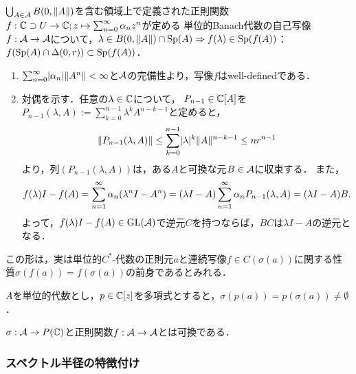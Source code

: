 \documentclass[uplatex,dvipdfmx]{jsreport}
\begin{document}
\begin{lemma}
    $\bigcup_{A\in\mathcal{A}}B(0,\|A\|)$を含む領域上で定義された正則関数$f:\mathbb{C}\supset U\to\mathbb{C};z\mapsto\sum_{n=0}^\infty\alpha_nz^n$が定める
    単位的Banach代数の自己写像$f:\mathcal{A}\to\mathcal{A}$について，$\lambda\in B(0,\|A\|)\cap\mathrm{Sp}(A)\Rightarrow f(\lambda)\in\mathrm{Sp}(f(A))$：$f(\mathrm{Sp}(A)\cap \Delta(0,r))\subset\mathrm{Sp}(f(A))$．
\end{lemma}
\begin{Proof}\mbox{}
    \begin{enumerate}
        \item $\sum_{n=0}^\infty\lvert\alpha_n\rvert\|A^n\|<\infty$と$\mathcal{A}$の完備性より，写像$f$はwell-definedである．
        \item 対偶を示す．任意の$\lambda\in\mathbb{C}$について，
        $P_{n-1}\in\mathbb{C}[A]$を$P_{n-1}(\lambda,A):=\sum_{k=0}^{n-1}\lambda^kA^{n-k-1}$と定めると，
        \[\|P_{n-1}(\lambda,A)\|\le\sum^{n-1}_{k=0}\lvert\lambda\rvert^k\|A\|^{n-k-1}\le nr^{n-1}\]
        より，列$(P_{n-1}(\lambda,A))$は，ある$A$と可換な元$B\in\mathcal{A}$に収束する．
        また，
        \[f(\lambda)I-f(A)=\sum^\infty_{n=1}\alpha_n(\lambda^nI-A^n)=(\lambda I-A)\sum^\infty_{n=1}\alpha_nP_{n-1}(\lambda,A)=(\lambda I-A)B.\]
        よって，$f(\lambda)I-f(A)\in\mathrm{GL}(\mathcal{A})$で逆元$C$を持つならば，$BC$は$\lambda I-A$の逆元となる．
    \end{enumerate}
\end{Proof}
\begin{remarks}
    この形は，実は単位的$C^*$-代数の正則元$a$と連続写像$f\in C(\sigma(a))$に関する性質$\sigma(f(a))=f(\sigma(a))$の前身であるとみれる．
\end{remarks}

\begin{theorem}[一般の代数に関するスペクトル写像定理]
    $A$を単位的代数とし，$p\in\mathbb{C}[z]$を多項式とすると，$\sigma(p(a))=p(\sigma(a))\ne\emptyset$．\cite{Murphy}
\end{theorem}
\begin{remarks}
    $\sigma:\mathcal{A}\to P(\mathbb{C})$と正則関数$f:\mathcal{A}\to\mathcal{A}$とは可換である．
\end{remarks}

\subsubsection{スペクトル半径の特徴付け}
\end{document}
